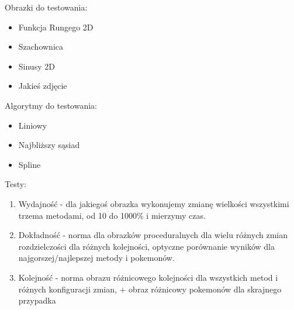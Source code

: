 \documentclass{article}
\begin{document}
Obrazki do testowania:
\begin{itemize}
  \item Funkcja Rungego 2D
  \item Szachownica
  \item Sinusy 2D
  \item Jakieś zdjęcie
\end{itemize}

Algorytmy do testowania:
\begin{itemize}
  \item Liniowy
  \item Najbliższy sąsiad
  \item Spline
\end{itemize}


Testy:
\begin{enumerate}
  \item Wydajność - dla jakiegoś obrazka wykonujemy zmianę wielkości wszystkimi trzema metodami,
  od 10 do 1000\% i mierzymy czas.

  \item Dokładność - norma dla obrazków proceduralnych dla wielu różnych zmian rozdzielczości dla 
  różnych kolejności, optyczne porównanie wyników dla najgorszej/najlepszej metody i pokemonów.

  \item Kolejność - norma obrazu różnicowego kolejności dla wszystkich metod i różnych konfiguracji
  zmian, + obraz różnicowy pokemonów dla skrajnego przypadka

\end{enumerate}
\end{document}
